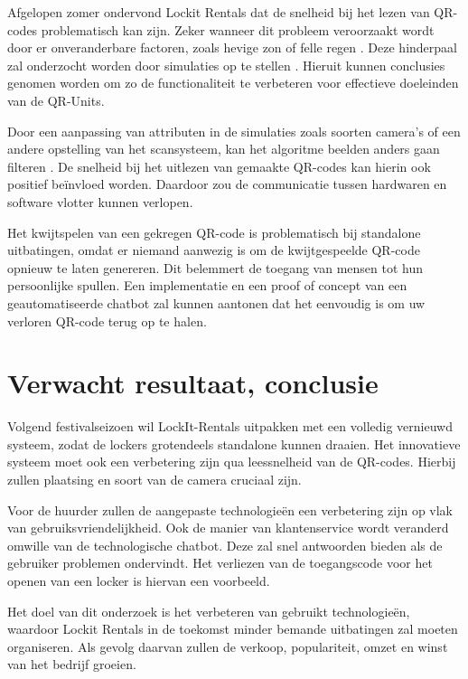 \documentclass{hogent-article}
\begin{document}
Afgelopen zomer ondervond Lockit Rentals dat de snelheid bij het lezen van QR-codes problematisch kan zijn. Zeker wanneer dit probleem veroorzaakt wordt door er onveranderbare factoren, zoals hevige zon of felle regen \autocite{Dr2022}.
Deze hinderpaal zal onderzocht worden door simulaties op te stellen \autocite{Skurowski2022}. Hieruit kunnen conclusies genomen worden om zo de functionaliteit te verbeteren voor effectieve doeleinden van de QR-Units. 

Door een aanpassing van attributen in de simulaties zoals soorten camera’s of een andere opstelling van het scansysteem, kan het algoritme beelden anders gaan filteren \autocite{Dr2022}. De snelheid bij het uitlezen van gemaakte QR-codes kan hierin ook positief beïnvloed worden. Daardoor zou de communicatie tussen hardwaren en software vlotter kunnen verlopen.

Het kwijtspelen van een gekregen QR-code is problematisch bij standalone uitbatingen, omdat er niemand aanwezig is om de kwijtgespeelde QR-code opnieuw te laten genereren. Dit belemmert de toegang van mensen tot hun persoonlijke spullen. Een implementatie en een proof of concept van een geautomatiseerde chatbot zal kunnen aantonen dat het eenvoudig is om uw verloren QR-code terug op te halen.





\section{Verwacht resultaat, conclusie}%
\label{sec:verwachte_resultaten}

Volgend festivalseizoen wil LockIt-Rentals uitpakken met een volledig vernieuwd systeem, zodat de lockers grotendeels standalone kunnen draaien. Het innovatieve systeem moet ook een verbetering zijn qua leessnelheid van de QR-codes. Hierbij zullen plaatsing en soort van de camera cruciaal zijn. 

Voor de huurder zullen de aangepaste technologieën een verbetering zijn op vlak van gebruiksvriendelijkheid. Ook de manier van klantenservice wordt veranderd omwille van de technologische chatbot. Deze zal snel antwoorden bieden als de gebruiker problemen ondervindt. Het verliezen van de toegangscode voor het openen van een locker is hiervan een voorbeeld.

Het doel van dit onderzoek is het verbeteren van gebruikt technologieën, waardoor Lockit Rentals in de toekomst minder bemande uitbatingen zal moeten organiseren. Als gevolg daarvan zullen de verkoop, populariteit, omzet en winst van het bedrijf groeien.


\printbibliography[heading=bibintoc]
\end{document}
